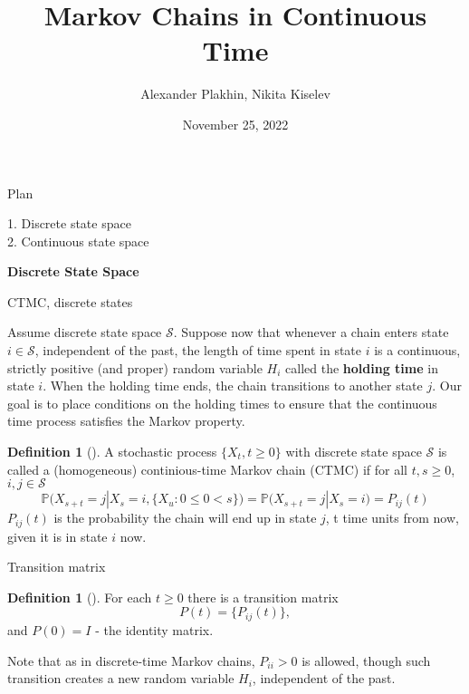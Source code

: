 \documentclass{beamer}%
\title{Markov Chains in Continuous Time}
\author[Alexander Plakhin, Nikita Kiselev]{Alexander Plakhin, Nikita Kiselev}
\institute[HSE FES Probability Theory Club]{HSE FES Probability Theory Club}
\date{November 25, 2022}
\theoremstyle{definition}
\newtheorem{mydef}[theorem]{Definition}
\renewcommand{\P}{\mathbb{P}}
\begin{document}
	
\begin{frame}
\titlepage
\end{frame}


\begin{frame}{Plan}

1. Discrete state space
\\
2. Continuous state space

\end{frame}


\begin{frame}{}

\centering
\textbf{\Large Discrete State Space}

\end{frame}


\begin{frame}{CTMC, discrete states}

Assume discrete state space $\mathcal{S}$. Suppose now that whenever a chain enters state $i\in\mathcal{S}$, independent of the past, the length of time spent in state $i$ is a continuous, strictly positive (and proper) random variable $H_i$ called the \textbf{holding time} in state $i$. When the holding time ends, the chain transitions to another state $j$. Our goal is to place conditions on the holding times to ensure that the continuous time process satisfies the Markov property.
\begin{mydef}[]
A stochastic process $\{X_t, t\geqslant0\}$ with discrete state space $\mathcal{S}$ is called a (homogeneous) continious-time Markov chain (CTMC) if for all $t, s\geqslant0$, $i, j\in\mathcal{S}$
$$\P\big(X_{s+t}=j|X_s=i, \{X_u: 0\leqslant0<s\}\big)=\P\big(X_{s+t}=j|X_s=i\big)=P_{ij}(t)$$
$P_{ij}(t)$ is the probability the chain will end up in state $j$, t time units from now, given it is in state $i$ now.
\end{mydef}

\end{frame}


\begin{frame}{Transition matrix}

\begin{mydef}[]
For each $t\geqslant0$ there is a transition matrix
$$P(t)=\big\{P_{ij}(t)\big\},$$
and $P(0)=I$ - the identity matrix.
\end{mydef}
Note that as in discrete-time Markov chains, $P_{ii}>0$ is allowed, though such transition creates a new random variable $H_i$, independent of the past.

\end{frame}
\end{document}
